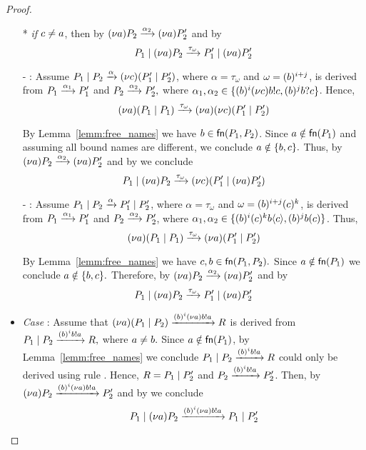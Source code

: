 \begin{proof}
\begin{itemize}
		* \emph{if $c\not=a$}, then by  $(\nu a)P_2\xrightarrow{\alpha_2}(\nu a)P_2'$ and by  
		\[
		P_1\;|\;(\nu a)P_2 \xrightarrow{\tau_\omega}P_1'\;|\;(\nu a)P_2'
		\] 
		
	- : Assume $P_1\;|\;P_2\xrightarrow{\alpha}(\nu c)(P_1'\;|\;P_2')$, where $\alpha=\tau_{\omega}$ and $\omega=\scope\NB^{i+j}%
	$, is derived from  $P_1\xrightarrow{\alpha_1}P_1'$ and $P_2\xrightarrow{\alpha_2}P_2',$ where $\alpha_1,\alpha_2\in\{{(b)^i(\nu c)b!c}, (b)^jb?c\}$. Hence, 
	\[
	(\nu a)(P_1\;|\;P_1)\xrightarrow{\tau_\omega} (\nu a)(\nu c)(P_1' \;|\; P_2')
	\] 
	
	By Lemma~\ref{lemm:free_names} we have $b\in\mathsf{fn}(P_1,P_2)$.  Since $a\notin\mathsf{fn}(P_1)$ and assuming all bound names are different, we conclude $a\notin\{b,c\}.$ Thus, by  $(\nu a)P_2\xrightarrow{\alpha_2}(\nu a)P_2'$ and by  we conclude 
	\[
	P_1\;|\;(\nu a)P_2 \xrightarrow{\tau_\omega}(\nu c)(P_1'\;|\;(\nu a)P_2')
	\]
	
	- : Assume $P_1\;|\;P_2\xrightarrow{\alpha}P_1'\;|\;P_2'$, where $\alpha=\tau_{\omega}$ and $\omega=\scope\NB^{i+j}%
	\scope\NC^{k}%
	$, is derived from $P_1\xrightarrow{\alpha_1}P_1'$ and $P_2\xrightarrow{\alpha_2}P_2'$, where $\alpha_1,\alpha_2\in\{(b)^i(c)^kb\langle c\rangle, (b)^jb(c)\}$. Thus,
	\[
	(\nu a)(P_1\;|\;P_1)\xrightarrow{\tau_\omega} (\nu a)(P_1' \;|\; P_2')
	\]
	
	By Lemma~\ref{lemm:free_names} we have $c,b\in\mathsf{fn}(P_1,P_2).$ Since $a\notin\mathsf{fn}(P_1)$ we conclude $a\notin\{b,c\}.$ Therefore, by  $(\nu a)P_2\xrightarrow{\alpha_2}(\nu a)P_2'$ and by  
	\[
	P_1\;|\;(\nu a)P_2 \xrightarrow{\tau_\omega}P_1'\;|\;(\nu a)P_2'
	\]

\item \emph{Case} : Assume that $(\nu a)(P_1\;|\;P_2)\xrightarrow{{(b)^i(\nu a)}b!a} R$ is derived from
 $P_1\;|\;P_2\xrightarrow{(b)^ib!a} R,$ where $a\not=b.$ Since $a\notin\mathsf{fn}(P_1)$, by Lemma~\ref{lemm:free_names} we conclude $P_1\;|\;P_2\xrightarrow{(b)^ib!a} R$ could only be derived using rule . Hence, $R=P_1\;|\; P_2'$ and $P_2\xrightarrow{(b)^ib!a}P_2'$. Then, by  $(\nu a)P_2\xrightarrow{{(b)^i(\nu a)}b!a}P_2'$ and by  we conclude 
 \[
 P_1\;|\;(\nu a)P_2\xrightarrow{{(b)^i(\nu a)}b!a}P_1\;|\;P_2'
 \]
\end{itemize}
\end{proof}

